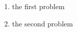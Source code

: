 \begin{homeworkProblem}[18]
\begin{enumerate}
\item the first problem
\item the second problem
\end{enumerate}
\end{homeworkProblem}